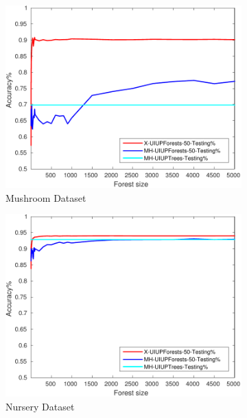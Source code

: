 \begin{figure}[ht]
\begin{subfigure}[b]{0.3\textwidth}
  	\includegraphics[width=\textwidth]{figs/PLPTF/Forests/MushroomDownsampled_Forests_X_MH.pdf}
  	\caption{Mushroom Dataset}
		\label{fig:Mush3}
	\end{subfigure}
  \begin{subfigure}[b]{0.3\textwidth}
		\centering
  	\includegraphics[width=\textwidth]{figs/PLPTF/Forests/NurseryDownsampledFurther_Forests_X_MH.pdf}
  	\caption{Nursery Dataset}
		\label{fig:N3}
	\end{subfigure}
  \begin{subfigure}[b]{0.3\textwidth}
		\centering

\end{subfigure}
\end{figure}
